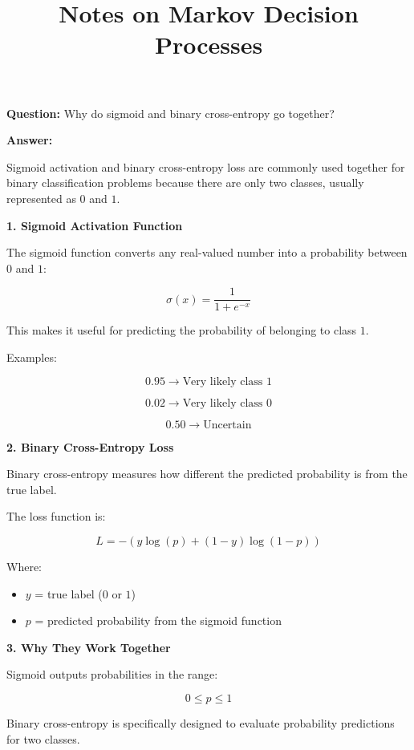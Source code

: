 \documentclass[conference]{IEEEtran}
\title{Notes on Markov Decision Processes}
\author{
\IEEEauthorblockN{Luis Mendez}
}
\begin{document}
\maketitle

\textbf{Question:} Why do sigmoid and binary cross-entropy go together?

\bigskip

\textbf{Answer:}

Sigmoid activation and binary cross-entropy loss are commonly used together for binary classification problems because there are only two classes, usually represented as \(0\) and \(1\).

\bigskip

\textbf{1. Sigmoid Activation Function}

The sigmoid function converts any real-valued number into a probability between \(0\) and \(1\):

\[
\sigma(x) = \frac{1}{1 + e^{-x}}
\]

This makes it useful for predicting the probability of belonging to class \(1\).

Examples:

\[
0.95 \rightarrow \text{Very likely class } 1
\]

\[
0.02 \rightarrow \text{Very likely class } 0
\]

\[
0.50 \rightarrow \text{Uncertain}
\]

\bigskip

\textbf{2. Binary Cross-Entropy Loss}

Binary cross-entropy measures how different the predicted probability is from the true label.

The loss function is:

\[
L = -\left( y \log(p) + (1-y)\log(1-p) \right)
\]

Where:

\begin{itemize}
    \item \(y\) = true label (\(0\) or \(1\))
    \item \(p\) = predicted probability from the sigmoid function
\end{itemize}

\bigskip

\textbf{3. Why They Work Together}

Sigmoid outputs probabilities in the range:

\[
0 \leq p \leq 1
\]

Binary cross-entropy is specifically designed to evaluate probability predictions for two classes.
\end{document}

